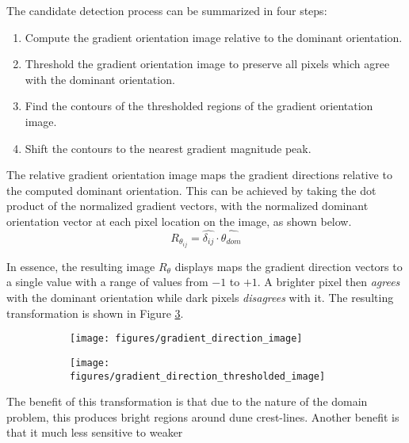 The candidate detection process can be summarized in four steps:

\begin{enumerate}
	\item Compute the gradient orientation image relative to the dominant orientation.
	\item Threshold the gradient orientation image to preserve all pixels which agree with the dominant orientation.
	\item Find the contours of the thresholded regions of the gradient orientation image.
	\item Shift the contours to the nearest gradient magnitude peak.
\end{enumerate}

The relative gradient orientation image maps the gradient directions relative to the computed dominant orientation. This can be achieved by taking the dot product of the normalized gradient vectors, with the normalized dominant orientation vector at each pixel location on the image, as shown below.
\[
R_{\theta_{ij}} = \hat{\delta_{ij}}\cdot \hat{\theta_{dom}}
\]

In essence, the resulting image $R_{\theta}$ displays maps the gradient direction vectors to a single value with a range of values from $-1$ to $+1$. A brighter pixel then \emph{agrees} with the dominant orientation while dark pixels \emph{disagrees} with it. The resulting transformation is shown in Figure \ref{fig:gradient_direction_image_transformation}.

\begin{figure}
	\centering
	\begin{subfigure}{0.48\textwidth}
		\centering
		\texttt{[image: figures/gradient\_direction\_image]}
		\caption{}
		\label{fig:gradient_direction_image}
	\end{subfigure}
	\begin{subfigure}{0.48\textwidth}
		\centering
		\texttt{[image: figures/gradient\_direction\_thresholded\_image]}
		\caption{}
		\label{fig:gradient_direction_thresholded_image}
	\end{subfigure}
	\caption{}
	\label{fig:gradient_direction_image_transformation}
\end{figure}

The benefit of this transformation is that due to the nature of the domain problem, this produces bright regions around dune crest-lines. Another benefit is that it much less sensitive to weaker  